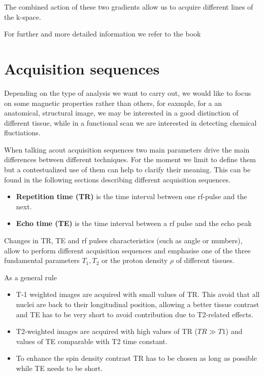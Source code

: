 \documentclass[10pt]{report}
\begin{document}
The combined action of these two gradients allow us to acquire different lines of the k-space.


For further and more detailed information we refer to the book \cite{brown-2014}

\section{Acquisition sequences}
Depending on the type of analysis we want to carry out, we would like to focus on some magnetic properties rather than others, for eaxmple, for a an anatomical, structural image, we may be interested in a good distinction of different tissue, while in a functional scan we are interested in detecting chemical fluctiations.

When talking acout acquisition sequences two main parameters drive the main differences between different techniques.
For the moment we limit to define them but a contestualized use of them can help to clarify their meaning.
This can be found in the following sections describing different acquisition sequences.

\begin{itemize}
\item \textbf{Repetition time (TR)} is the time interval between one rf-pulse and the next.
\item \textbf{Echo time (TE)} is the time interval between a rf pulse and the echo peak
\end{itemize}

Changes in TR, TE and rf pulses characteristics (such as angle or numbers), allow to perform different acquisition sequences and emphasise one of the three fundamental parameters $T_1, T_2$ or the proton density $\rho$ of different tissues.

As a general rule
\begin{itemize}
\item T-1 weighted images are acquired with small values of TR. This avoid that all nuclei are back to their longitudinal position, allowing a better tissue contrast and TE has to be very short to avoid contribution due to T2-related effects.
\item T2-weighted images are acquired with high values of TR ($TR \gg T1$) and values of TE comparable with T2 time constant.
\item To enhance the spin density contrast TR has to be chosen as long as possible while TE needs to be short.
\end{itemize}
\end{document}
